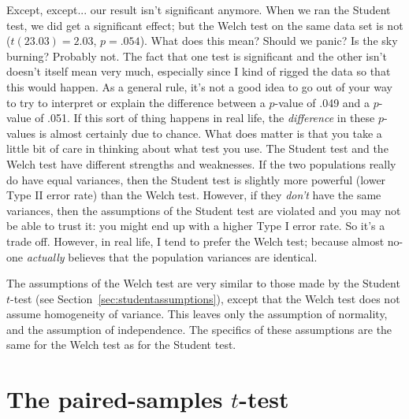 Except, except... our result isn't significant anymore. When we ran the Student test, we did get a significant effect; but the Welch test on the same data set is not ($t(23.03) = 2.03$, $p = .054$). What does this mean? Should we panic? Is the sky burning? Probably not. The fact that one test is significant and the other isn't doesn't itself mean very much, especially since I kind of rigged the data so that this would happen. As a general rule, it's not a good idea to go out of your way to try to interpret or explain the difference between a $p$-value of .049 and a $p$-value of .051. If this sort of thing happens in real life, the {\it difference} in these $p$-values is almost certainly due to chance. What does matter is that you take a little bit of care in thinking about what test you use. The Student test and the Welch test have different strengths and weaknesses. If the two populations really do have equal variances, then the Student test is slightly more powerful (lower Type II error rate) than the Welch test. However, if they {\it don't} have the same variances, then the assumptions of the Student test are violated and you may not be able to trust it: you might end up with a higher Type I error rate. So it's a trade off. However, in real life, I tend to prefer the Welch test; because almost no-one {\it actually} believes that the population variances are identical.



The assumptions of the Welch test are very similar to those made by the Student $t$-test (see Section~\ref{sec:studentassumptions}), except that the Welch test does not assume homogeneity of variance. This leaves only the assumption of normality, and the assumption of independence. The specifics of these assumptions are the same for the Welch test as for the Student test. 

\vspace*{12pt}



\section{The paired-samples $t$-test~\label{sec:pairedsamplesttest}}

